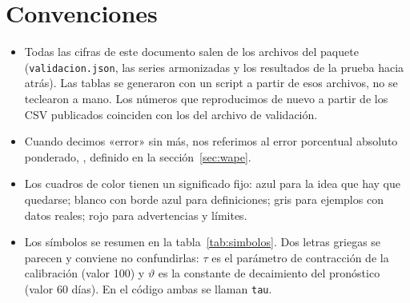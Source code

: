 \section{Convenciones}

\begin{itemize}
  \item Todas las cifras de este documento salen de los archivos del paquete (\texttt{validacion.json}, las series armonizadas y los resultados de la prueba hacia atrás). Las tablas se generaron con un script a partir de esos archivos, no se teclearon a mano. Los números que reproducimos de nuevo a partir de los CSV publicados coinciden con los del archivo de validación.
  \item Cuando decimos «error» sin más, nos referimos al error porcentual absoluto ponderado, \WAPE, definido en la sección~\ref{sec:wape}.
  \item Los cuadros de color tienen un significado fijo: azul para la idea que hay que quedarse; blanco con borde azul para definiciones; gris para ejemplos con datos reales; rojo para advertencias y límites.
  \item Los símbolos se resumen en la tabla~\ref{tab:simbolos}. Dos letras griegas se parecen y conviene no confundirlas: $\tau$ es el parámetro de contracción de la calibración (valor 100) y $\vartheta$ es la constante de decaimiento del pronóstico (valor 60 días). En el código ambas se llaman \texttt{tau}.
\end{itemize}

